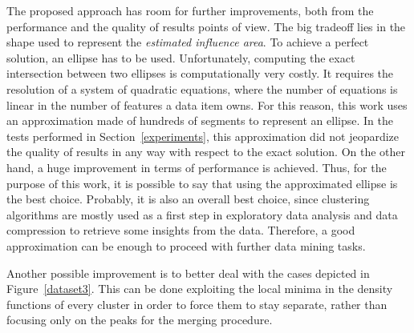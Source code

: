 The proposed approach has room for further improvements, both from
the performance and the quality of results points of view. The big tradeoff
lies in the shape used to represent the \emph{estimated influence area}. To
achieve a perfect solution, an ellipse has to be used. Unfortunately, computing
the exact intersection between two ellipses is computationally very costly.
It requires the resolution of a system of quadratic equations, where the number
of equations is linear in the number of features a data item owns.
For this reason, this work uses an approximation made of hundreds of segments
to represent an ellipse. In the tests performed in Section~\ref{experiments},
this approximation did not jeopardize the quality of results in any way with
respect to the exact solution. On the other hand, a huge improvement in terms
of performance is achieved. Thus, for the purpose of this work, it is possible
to say that using the approximated ellipse is the best choice. Probably, it is
also an overall best choice, since clustering algorithms are mostly used as
a first step in exploratory data analysis and data compression to retrieve
some insights from the data. Therefore, a good approximation can be enough
to proceed with further data mining tasks.

Another possible improvement is to better deal with the cases depicted in
Figure~\ref{dataset3}. This can be done exploiting the local minima
in the density functions of every cluster in order to force them to stay
separate, rather than focusing only on the peaks for the merging procedure.
